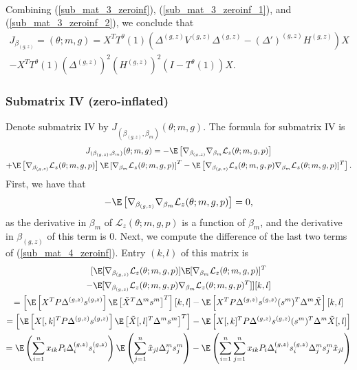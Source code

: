 \documentclass[11pt]{article}
\begin{document}
\begin{appendices}
\begin{refsection}
\begin{multline}
\end{multline}
Combining (\ref{sub_mat_3_zeroinf}), (\ref{sub_mat_3_zeroinf_1}), and (\ref{sub_mat_3_zeroinf_2}), we conclude that
\begin{multline}\label{sub_mat_3_zeroinf_formula}
J_{\beta_{(g, z)}} = \left( \theta; m, g \right) =  X^T T^{\theta}(1) ( \Delta^{(g,z)}V^{(g,z)}\Delta^{(g,z)} - (\Delta')^{(g,z)} H^{(g,z)}) X \\ - X^T T^{\theta}(1) \left(\Delta^{(g,z)}\right)^2 \left( H^{(g,z)} \right)^2 \left( I - T^{\theta}(1) \right) X.
\end{multline}

\subsubsection*{Submatrix IV (zero-inflated)}
Denote submatrix IV by $J_{(\beta_{(g,z)}, \beta_m)}(\theta; m, g)$. The formula for submatrix IV is
\begin{multline}\label{sub_mat_4_zeroinf}
J_{(\beta_{(g,z)}, \beta_m)}(\theta; m, g) = - \E \left[\nabla_{\beta_{(g,z)}} \nabla_{\beta_m} \mathcal{L}_z (\theta; m, g, p) \right] \\ + \E\left[ \nabla_{\beta_{(g,z)} }\mathcal{L}_z(\theta ; m,g,p) \right]\E\left[\nabla_{\beta_m}\mathcal{L}_z(\theta; m,g,p)\right]^T - \E \left[\nabla_{\beta_{(g,z)}}\mathcal{L}_z (\theta; m,g,p) \nabla_{\beta_m}\mathcal{L}_z(\theta; m,g,p)]^T \right].
\end{multline} 
First, we have that
\begin{equation}\label{sub_mat_4_zeroinf_1}
- \E \left[\nabla_{\beta_{(g,z)}} \nabla_{\beta_m} \mathcal{L}_z (\theta; m, g, p) \right] = 0,
\end{equation}
 as the derivative in $\beta_m$ of $\mathcal{L}_z(\theta; m, g, p)$ is a function of $\beta_m$, and the derivative in $\beta_{(g,z)}$ of this term is $0$. Next, we compute the difference of the last two terms of (\ref{sub_mat_4_zeroinf}). Entry $(k,l)$ of this matrix is
\begin{multline}\label{sub_mat_4_zeroinf_2}
[\E[\nabla_{\beta_{(g,z)}}\mathcal{L}_z(\theta; m, g, p) ] \E [\nabla_{\beta_m} \mathcal{L}_z(\theta; m, g, p) ]^T \\ - \E [\nabla_{\beta_{(g,z)}} \mathcal{L}_z(\theta; m, g, p) \nabla_{\beta_m}\mathcal{L}_z(\theta; m, g, p)^T ] ][k,l] \\ 
= \left[ \E \left[ {X}^T P \Delta^{(g,z)} s^{(g,z)} \right] \E\left[\tilde{X}^T \Delta^m s^m\right]^T\right][k,l] - \E \left[{X}^T P \Delta^{(g,z)} s^{(g,z)} (s^m)^T \Delta^m \tilde{X} \right][k,l] \\ = \left[\E\left[{X}[,k]^T P \Delta^{(g,z)} s^{(g,z)}\right]\E\left[\tilde{X}[,l]^T \Delta^m s^m\right]^T\right] - \E \left[{X}[,k]^T P \Delta^{(g,z)} s^{(g,z)} (s^m)^T \Delta^m \tilde{X}[,l] \right] \\ = \E\left(\sum_{i=1}^n x_{ik} P_i \Delta^{(g,z)}_i s^{(g,z)}_i\right) \E \left(\sum_{j=1}^n \tilde{x}_{jl} \Delta^m_j s^m_j \right) - \E \left(\sum_{i=1}^n \sum_{j=1}^n x_{ik} P_i \Delta^{(g,z)}_i s^{(g,z)}_i \Delta^m_j s^m_j \tilde{x}_{jl}  \right) \\ 

\end{multline}
\end{refsection}
\end{appendices}
\end{document}
